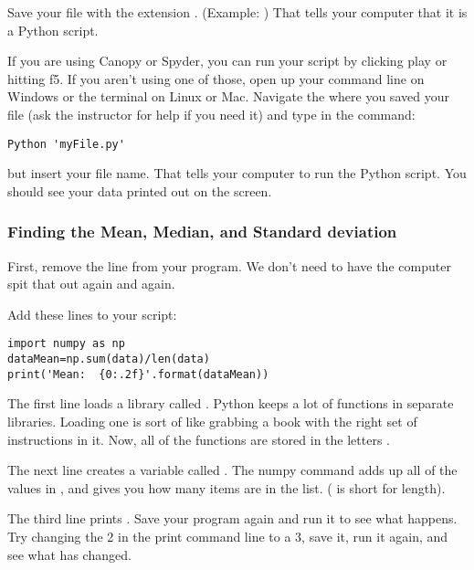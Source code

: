 \documentclass[twoside,11pt,ShortChapTitles]{BYUTextbook}
\begin{document}
Save your file with the extension . (Example: )  That tells your computer that it is a Python script.

If you are using Canopy or Spyder, you can run your script by clicking play or hitting f5.  If you aren't using one of those, open up your command line on Windows or the terminal on Linux or Mac.  Navigate the where you saved your file (ask the instructor for help if you need it) and type in the command:
\begin{lstlisting}
Python 'myFile.py'

\end{lstlisting}
but insert your file name. That tells your computer to run the Python script.  You should see your data printed out on the screen.

\subsubsection{Finding the Mean, Median, and Standard deviation}

First, remove the  line from your program. We don't need to have the computer spit that out again and again.

Add these lines to your script:
\begin{lstlisting}
import numpy as np
dataMean=np.sum(data)/len(data)
print('Mean:  {0:.2f}'.format(dataMean))

\end{lstlisting}

The first line loads a library called .  Python keeps a lot of functions in separate libraries.  Loading one is sort of like grabbing a book with the right set of instructions in it.  Now, all of the  functions are stored in the letters .

The next line creates a variable called . The numpy  command adds up all of the values in , and  gives you how many items are in the  list. ( is short for length).

The third line prints .  Save your program again and run it to see what happens.  Try changing the 2 in the print command line to a 3, save it, run it again, and see what has changed.
\end{document}

